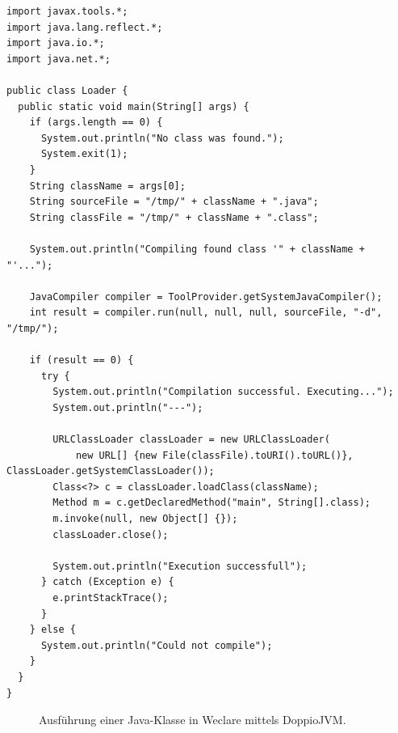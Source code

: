 \begin{minipage}{\linewidth}
\begin{lstlisting}
import javax.tools.*;
import java.lang.reflect.*;
import java.io.*;
import java.net.*;

public class Loader {
  public static void main(String[] args) {
    if (args.length == 0) {
      System.out.println("No class was found.");
      System.exit(1);
    }
    String className = args[0];
    String sourceFile = "/tmp/" + className + ".java";
    String classFile = "/tmp/" + className + ".class";

    System.out.println("Compiling found class '" + className + "'...");

    JavaCompiler compiler = ToolProvider.getSystemJavaCompiler();
    int result = compiler.run(null, null, null, sourceFile, "-d", "/tmp/");

    if (result == 0) {
      try {
        System.out.println("Compilation successful. Executing...");
        System.out.println("---");

        URLClassLoader classLoader = new URLClassLoader(
            new URL[] {new File(classFile).toURI().toURL()}, ClassLoader.getSystemClassLoader());
        Class<?> c = classLoader.loadClass(className);
        Method m = c.getDeclaredMethod("main", String[].class);
        m.invoke(null, new Object[] {});
        classLoader.close();

        System.out.println("Execution successfull");
      } catch (Exception e) {
        e.printStackTrace();
      }
    } else {
      System.out.println("Could not compile");
    }
  }
}
\end{lstlisting}
\end{minipage}

\begin{figure}[H]
    \centering
    \setlength{\fboxsep}{0pt}
    \setlength{\fboxrule}{0.5pt}
    \caption{Ausführung einer Java-Klasse in Weclare mittels DoppioJVM.}
    \label{abb:weclare_jvm_console}
\end{figure}

